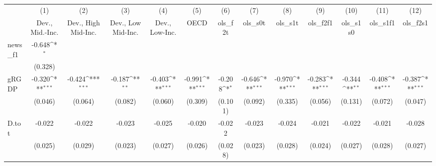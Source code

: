 {
\def\sym#1{\ifmmode^{#1}\else\(^{#1}\)\fi}
\begin{tabular}{l*{12}{c}}
\toprule
            &\multicolumn{1}{c}{(1)}&\multicolumn{1}{c}{(2)}&\multicolumn{1}{c}{(3)}&\multicolumn{1}{c}{(4)}&\multicolumn{1}{c}{(5)}&\multicolumn{1}{c}{(6)}&\multicolumn{1}{c}{(7)}&\multicolumn{1}{c}{(8)}&\multicolumn{1}{c}{(9)}&\multicolumn{1}{c}{(10)}&\multicolumn{1}{c}{(11)}&\multicolumn{1}{c}{(12)}\\
            &\multicolumn{1}{c}{Dev., Mid.-Inc.}&\multicolumn{1}{c}{Dev., High Mid-Inc.}&\multicolumn{1}{c}{Dev., Low Mid-Inc.}&\multicolumn{1}{c}{Dev., Low-Inc.}&\multicolumn{1}{c}{OECD}&\multicolumn{1}{c}{ols\_f2t}&\multicolumn{1}{c}{ols\_s0t}&\multicolumn{1}{c}{ols\_s1t}&\multicolumn{1}{c}{ols\_f2f1}&\multicolumn{1}{c}{ols\_s1s0}&\multicolumn{1}{c}{ols\_s1f1}&\multicolumn{1}{c}{ols\_f2s1}\\
\midrule
news\_f1     &      -0.648\sym{*}  &                     &                     &                     &                     &                     &                     &                     &                     &                     &                     &                     \\
            &     (0.328)         &                     &                     &                     &                     &                     &                     &                     &                     &                     &                     &                     \\
\addlinespace
gRGDP       &      -0.320\sym{***}&      -0.424\sym{***}&      -0.187\sym{**} &      -0.403\sym{***}&      -0.991\sym{***}&      -0.208\sym{*}  &      -0.646\sym{***}&      -0.970\sym{***}&      -0.283\sym{***}&      -0.344\sym{**} &      -0.408\sym{***}&      -0.387\sym{***}\\
            &     (0.046)         &     (0.064)         &     (0.082)         &     (0.060)         &     (0.309)         &     (0.101)         &     (0.092)         &     (0.335)         &     (0.056)         &     (0.131)         &     (0.072)         &     (0.047)         \\
\addlinespace
D.tot       &      -0.022         &      -0.022         &      -0.023         &      -0.025         &      -0.020         &      -0.022         &      -0.023         &      -0.024         &      -0.021         &      -0.022         &      -0.021         &      -0.028         \\
            &     (0.025)         &     (0.029)         &     (0.023)         &     (0.027)         &     (0.026)         &     (0.028)         &     (0.023)         &     (0.028)         &     (0.024)         &     (0.027)         &     (0.028)         &     (0.027)         \\

\end{tabular}}
